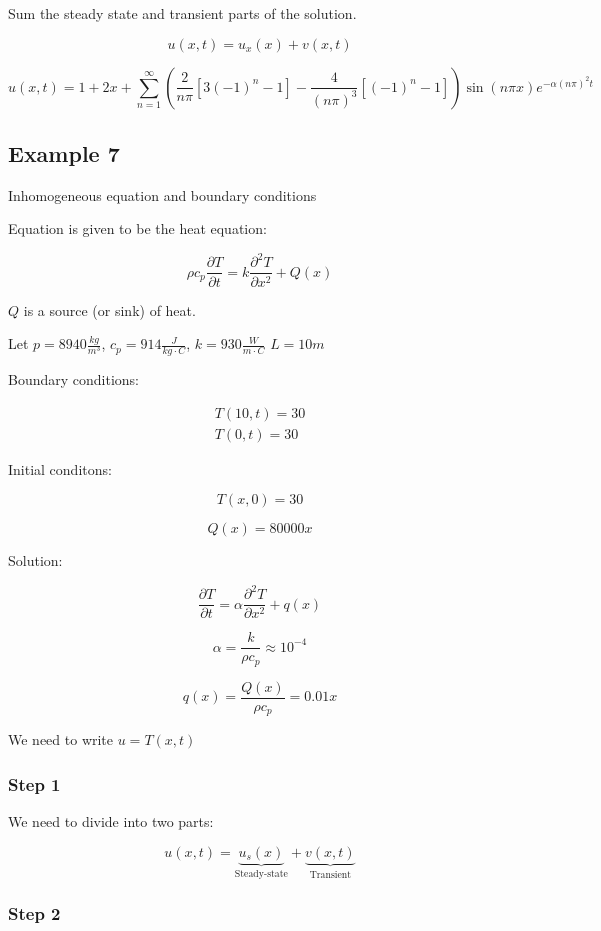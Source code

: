 Sum the steady state and transient parts of the solution. 

$$u(x,t) = u_x (x) + v(x,t)$$

$$u(x,t) = 1 + 2x + \sum_{n = 1}^\infty \left( \frac{2}{n \pi} \left[ 3(-1)^n - 1 \right] - \frac{4}{(n \pi)^3} \left[(-1)^n - 1 \right] \right) \sin(n \pi x) e^{-\alpha (n \pi)^2 t}$$

\subsection{Example 7}

Inhomogeneous equation and boundary conditions

Equation is given to be the heat equation:

$$\rho c_p \frac{\partial T}{\partial t} = k \frac{\partial^2 T}{\partial x^2} + Q(x)$$

$Q$ is a source (or sink) of heat. 

Let $p = 8940 \frac{kg}{m^3}$, $c_p = 914 \frac{J}{kg \cdot C}$, $k = 930 \frac{W}{m \cdot C}$ $L = 10 m$

Boundary conditions:

$$\begin{matrix} T(10,t) = 30 \\ T(0,t) = 30 \end{matrix}$$

Initial conditons:

$$T(x,0) = 30$$

$$Q(x) = 80000 x$$

Solution:

$$\frac{\partial T}{\partial t} = \alpha \frac{\partial^2 T}{\partial x^2} + q(x)$$

$$\alpha = \frac{k}{\rho c_p} \approx 10^{-4}$$

$$q(x) = \frac{Q(x)}{\rho c_p} = 0.01 x$$

We need to write $u = T(x,t)$

\subsubsection{Step 1}

We need to divide into two parts: 

$$u(x,t) = \underbrace{u_s (x)}_{\text{Steady-state}} + \underbrace{v(x,t)}_{\text{Transient}}$$

\subsubsection{Step 2}

